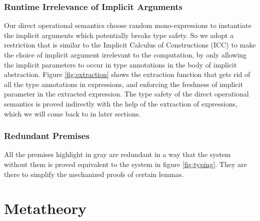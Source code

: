 \documentclass{llncs}
\begin{document}
\subsubsection{Runtime Irrelevance of Implicit Arguments}

Our direct operational semantics choose random mono-expressions to instantiate
the implicit arguments which potentially breaks type safety. So we adopt a
restriction that is similar to the Implicit Calculus of Constructions (ICC) \cite{miquel2001implicit}
to make the choice of implicit argument irrelevant to the computation, by only
allowing the implicit parameters to occur in type annotations in the body of
implicit abstraction. Figure \ref{fig:extraction} shows the extraction function
that gets rid of all the type annotations in expressions, and enforcing the
freshness of implicit parameter in the extracted expression. The type safety of
the direct operational semantics is proved indirectly with the help of
the extraction of expressions, which we will come back to in later sections.

\subsubsection{Redundant Premises}

All the premises highlight in gray are redundant in a way that
the system without them is proved equivalent to the system in figure \ref{fig:typing}.
They are there to simplify the mechanized proofs of certain lemmas.

\section{Metatheory}



\end{document}
